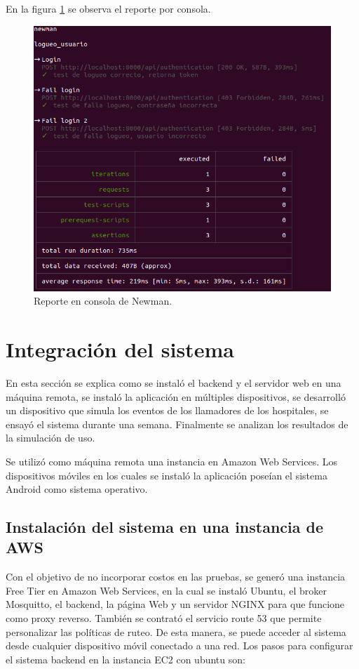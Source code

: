 En la figura \ref{fig:reporte cli Newman} se observa el reporte por consola.
\begin{figure}[ht]
	\centering
	\includegraphics[scale=.50]{./Figures/newman-1.png}
	\caption{Reporte en consola de Newman.}
	\label{fig:reporte cli Newman}
\end{figure}




\pagebreak

\section{Integración del sistema}
\label{Integración del sistema}

En esta sección se explica como se instaló el backend y el servidor web en una máquina remota, se instaló la aplicación en múltiples dispositivos, se desarrolló un dispositivo que simula los eventos de los llamadores de los hospitales, se ensayó el sistema durante una semana.  Finalmente se analizan los resultados de la simulación de uso.

Se utilizó como máquina remota una instancia en Amazon Web Services. Los dispositivos móviles en los cuales se instaló la aplicación poseían el sistema Android como sistema operativo.

\subsection{Instalación del sistema en una instancia de AWS}
Con el objetivo de no incorporar costos en las pruebas, se generó una instancia Free Tier en Amazon Web Services, en la cual se instaló Ubuntu, el broker Mosquitto, el backend, la página Web y un servidor NGINX para que funcione como proxy reverso. También se contrató el servicio route 53 que permite personalizar las políticas de ruteo.
De esta manera, se puede acceder al sistema desde cualquier dispositivo móvil conectado a una red.
Los pasos para configurar el sistema backend en la instancia EC2 con ubuntu son:
\pagebreak

